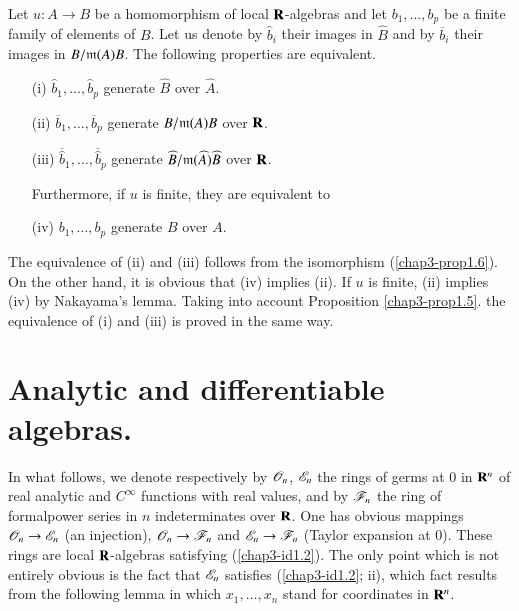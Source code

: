 \begin{corollary}\label{chap3-coro1.8}
Let $u:A\to B$ be a homomorphism of local $\mathbf{R}$-algebras and let $b_{1},\ldots,b_{p}$ be a finite family of elements of $B$. Let us denote by $\widehat{b}_{i}$ their images in $\widehat{B}$ and by $\overline{b}_{i}$ their images in $B/\mathfrak{m}(A)B$. The following properties are equivalent.
\begin{itemize}
\item[\rm(i)] $\widehat{b}_{1},\ldots,\widehat{b}_{p}$ generate $\widehat{B}$ over $\widehat{A}$.

\item[\rm(ii)] $\overline{b}_{1},\ldots,\overline{b}_{p}$ generate $B/\mathfrak{m}(A)B$ over $\mathbf{R}$.

\item[\rm(iii)] $\overline{\widehat{b}}_{1},\ldots,\overline{\widehat{b}}_{p}$ generate $\widehat{B}/\mathfrak{m}(\widehat{A})\widehat{B}$ over $\mathbf{R}$.

Furthermore, if $u$ is finite, they are equivalent to

\item[\rm(iv)] $b_{1},\ldots,b_{p}$ generate $B$ over $A$.
\end{itemize}
\end{corollary}

The equivalence of (ii) and (iii) follows from the isomorphism (\ref{chap3-prop1.6}). On the other hand, it is obvious that (iv) implies (ii). If $u$ is finite, (ii) implies (iv) by Nakayama's lemma. Taking into account Proposition \ref{chap3-prop1.5}. the equivalence of (i) and (iii) is proved in the same way.

\section[Analytic and differentiable algebras]{Analytic and differentiable algebras.}\label{chap3-sec2}

In what follows, we denote respectively by $\mathscr{O}_{n}$, $\mathscr{E}_{n}$ the rings of germs at $0$ in $\mathbf{R}^{n}$ of real analytic and $C^{\infty}$ functions with real values, and by $\mathscr{F}_{n}$ the ring of formal\pageoriginale power series in $n$ indeterminates over $\mathbf{R}$. One has obvious mappings $\mathscr{O}_{n}\to \mathscr{E}_{n}$ (an injection), $\mathscr{O}_{n}\to \mathscr{F}_{n}$ and $\mathscr{E}_{n}\to \mathscr{F}_{n}$ (Taylor expansion at $0$). These rings are local $\mathbf{R}$-algebras satisfying (\ref{chap3-id1.2}). The only point which is not entirely obvious is the fact that $\mathscr{E}_{n}$ satisfies (\ref{chap3-id1.2}; ii), which fact results from the following lemma in which $x_{1},\ldots,x_{n}$ stand for coordinates in $\mathbf{R}^{n}$.

